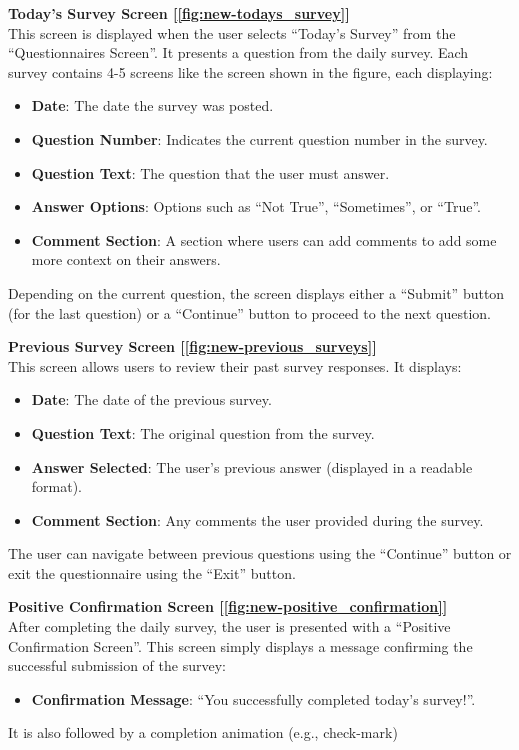 \vspace{5mm}

\noindent \textbf{Today's Survey Screen [\ref{fig:new-todays_survey}]} \\
This screen is displayed when the user selects ``Today's Survey'' from the ``Questionnaires Screen''. It presents a question from the daily survey. Each survey contains 4-5 screens like the screen shown in the figure, each displaying:
\begin{itemize}
    \item \textbf{Date}: The date the survey was posted.
    \item \textbf{Question Number}: Indicates the current question number in the survey.
    \item \textbf{Question Text}: The question that the user must answer.
    \item \textbf{Answer Options}: Options such as ``Not True'', ``Sometimes'', or ``True''.
    \item \textbf{Comment Section}: A section where users can add comments to add some more context on their answers.
\end{itemize}
\noindent Depending on the current question, the screen displays either a ``Submit'' button (for the last question) or a ``Continue'' button to proceed to the next question.

\vspace{5mm}

\noindent \textbf{Previous Survey Screen [\ref{fig:new-previous_surveys}]} \\
This screen allows users to review their past survey responses. It displays:
\begin{itemize}
    \item \textbf{Date}: The date of the previous survey.
    \item \textbf{Question Text}: The original question from the survey.
    \item \textbf{Answer Selected}: The user's previous answer (displayed in a readable format).
    \item \textbf{Comment Section}: Any comments the user provided during the survey.
\end{itemize}
\noindent The user can navigate between previous questions using the ``Continue'' button or exit the questionnaire using the ``Exit'' button.

\vspace{5mm}

\noindent \textbf{Positive Confirmation Screen [\ref{fig:new-positive_confirmation}]} \\
After completing the daily survey, the user is presented with a ``Positive Confirmation Screen''. This screen simply displays a message confirming the successful submission of the survey: 
\begin{itemize}
    \item \textbf{Confirmation Message}: ``You successfully completed today's survey!''.
\end{itemize}
\noindent It is also followed by a completion animation (e.g., check-mark)

